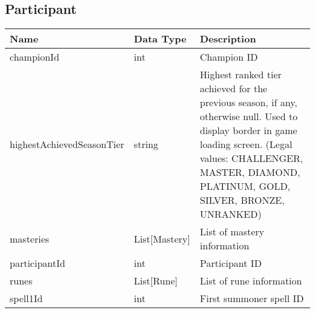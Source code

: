 \subsection{Participant}
\begin{table}[!h]
\footnotesize
\centering
\begin{tabular}{llp{5cm}}
\textbf{Name}             & \textbf{Data Type}  & \textbf{Description}                                                                                                                                                                                                                                     \\ \hline
championId                & int                 & Champion ID                                                                                                                                                                                                                                              \\ \hline
highestAchievedSeasonTier & string              & Highest ranked tier achieved for the previous season, if any, otherwise null. Used to display border in game loading screen. (Legal values: CHALLENGER, MASTER, DIAMOND, PLATINUM, GOLD, SILVER, BRONZE, UNRANKED)                                       \\ \hline
masteries                 & List{[}Mastery{]}   & List of mastery information                                                                                                                                                                                                                              \\ \hline
participantId             & int                 & Participant ID                                                                                                                                                                                                                                           \\ \hline
runes                     & List{[}Rune{]}      & List of rune information                                                                                                                                                                                                                                 \\ \hline
spell1Id                  & int                 & First summoner spell ID                                                                                                                                                                                                                                  \\ \hline

\end{tabular}
\end{table}
